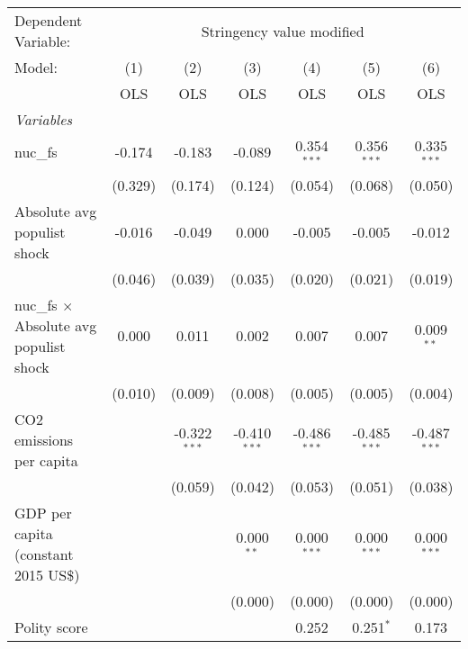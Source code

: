 
\begingroup
\centering
\begin{tabular}{lcccccc}
   \toprule
   Dependent Variable: & \multicolumn{6}{c}{Stringency value modified}\\
   Model:                                         & (1)     & (2)            & (3)            & (4)            & (5)            & (6)\\  
                                                  &  OLS    & OLS            & OLS            & OLS            & OLS            & OLS\\  
   \midrule
   \emph{Variables}\\
   nuc\_fs                                        & -0.174  & -0.183         & -0.089         & 0.354$^{***}$  & 0.356$^{***}$  & 0.335$^{***}$\\   
                                                  & (0.329) & (0.174)        & (0.124)        & (0.054)        & (0.068)        & (0.050)\\   
   Absolute avg populist shock                    & -0.016  & -0.049         & 0.000          & -0.005         & -0.005         & -0.012\\   
                                                  & (0.046) & (0.039)        & (0.035)        & (0.020)        & (0.021)        & (0.019)\\   
   nuc\_fs $\times$ Absolute avg populist shock   & 0.000   & 0.011          & 0.002          & 0.007          & 0.007          & 0.009$^{**}$\\   
                                                  & (0.010) & (0.009)        & (0.008)        & (0.005)        & (0.005)        & (0.004)\\   
   CO2 emissions per capita                       &         & -0.322$^{***}$ & -0.410$^{***}$ & -0.486$^{***}$ & -0.485$^{***}$ & -0.487$^{***}$\\   
                                                  &         & (0.059)        & (0.042)        & (0.053)        & (0.051)        & (0.038)\\   
   GDP per capita (constant 2015 US\$)            &         &                & 0.000$^{**}$   & 0.000$^{***}$  & 0.000$^{***}$  & 0.000$^{***}$\\   
                                                  &         &                & (0.000)        & (0.000)        & (0.000)        & (0.000)\\   
   Polity score                                   &         &                &                & 0.252          & 0.251$^{*}$    & 0.173\\   

\end{tabular}
